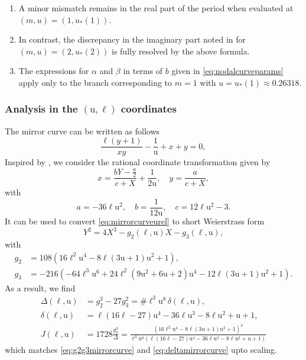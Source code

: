 \documentclass[11pt, a4paper]{article}
\def\rishi#1{{\color{magenta} #1}}
\newcommand{\ur}{\mathrm{u}}
\numberwithin{equation}{section}
\begin{document}
\vspace{-1em}
\rishi{
  \begin{enumerate}
    \item A minor mismatch remains in the real part of the period when evaluated at $(m,u) = (1, u_*(1))$.  
    \item In contrast, the discrepancy in the imaginary part noted in \cite{Marino:LocalF1Notes} for $(m,u) = (2, u_*(2))$ is fully resolved by the above formula.
    \item The expressions for $\alpha$ and $\beta$ in terms of $b$ given in \cref{eq:nodalcurveparams} apply only to the branch corresponding to $m=1$ with $u=u_*(1)\approx 0.26318$.
  \end{enumerate}
}


\subsubsection{Analysis in the \texorpdfstring{$(\ur, \ell)$}{(ur, el)} coordinates}

The mirror curve can be written as follows
\begin{equation}\label{eq:mirrorcurveurel}
  \frac{\ell (y+1)}{x y}-\frac{1}{\ur}+x+y = 0,
\end{equation}
Inspired by \cite{Marino:LocalF1Notes}, we consider the rational coordinate transformation given by
\begin{equation}
  x = \frac{b Y-\frac{a}{2}}{c+X}+\frac{1}{2 \ur}, \quad y = \frac{a}{c+X},
\end{equation}
with
\begin{equation}
  a = -36 \ell \ur^2, \quad b = \frac{1}{12 \ur}, \quad c = 12 \ell \ur^2-3.
\end{equation}
It can be used to convert \cref{eq:mirrorcurveurel} to short Weierstrass form
\begin{equation}
  Y^2 = 4X^3 - g_2(\ell, \ur) X - g_3(\ell, \ur),
\end{equation}
with
\begin{equation}
  \begin{aligned}
    g_2 &= 108 \left(16 \ell^2 \ur^4-8 \ell (3 \ur+1) \ur^2+1\right), \\
    g_3 &= -216 \left(-64 \ell^3 \ur^6+24 \ell^2 \left(9 \ur^2+6 \ur+2\right) \ur^4-12 \ell (3 \ur+1) \ur^2+1\right).
  \end{aligned}
\end{equation}
As a result, we find
\begin{align}
  \Delta(\ell, \ur) &= g_2^3-27 g_3^2 = \# \ell^3 \ur^8 \, \delta(\ell, \ur), \\
  \delta(\ell, \ur) &= \ell (16 \ell-27) \ur^4-36 \ell \ur^3-8 \ell \ur^2+\ur+1, \\
  J(\ell, \ur) &= 1728 \frac{g_2^3}{\Delta} = \frac{\left(16 \ell^2 \ur^4-8 \ell (3 \ur+1) \ur^2+1\right)^3}{\ell^3 \ur^8 \left(\ell (16 \ell-27) \ur^4-36 \ell \ur^3-8 \ell \ur^2+\ur+1\right)}
\end{align}
which matches \cref{eq:g2g3mirrorcurve} and \cref{eq:deltamirrorcurve} upto scaling.
\end{document}
